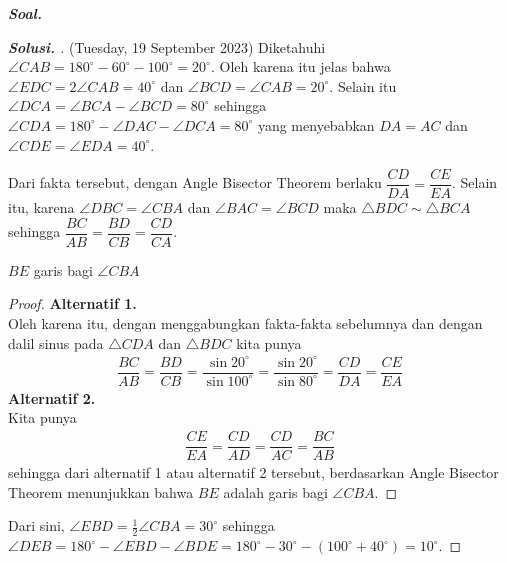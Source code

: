 \textbf{\textit{Soal. }}
\begin{proof}[\textbf{Solusi. }] (Tuesday, 19 September 2023) Diketahuhi $\angle CAB = 180^\circ - 60^\circ - 100^\circ = 20^\circ$. Oleh karena itu jelas bahwa $\angle EDC = 2\angle CAB = 40^\circ$ dan $\angle BCD = \angle CAB = 20^\circ$. Selain itu $\angle DCA = \angle BCA - \angle BCD = 80^\circ$ sehingga $\angle CDA = 180^\circ - \angle DAC - \angle DCA = 80^\circ$ yang menyebabkan $DA=AC$ dan $\angle CDE = \angle EDA = 40^\circ$.
    
Dari fakta tersebut, dengan Angle Bisector Theorem berlaku $\dfrac{CD}{DA} = \dfrac{CE}{EA}$.
Selain itu, karena $\angle DBC = \angle CBA$ dan $\angle BAC = \angle BCD$ maka $\triangle BDC \sim \triangle BCA$ sehingga $\dfrac{BC}{AB} = \dfrac{BD}{CB} = \dfrac{CD}{CA}$.

\begin{lemmarev}
    $BE$ garis bagi $\angle CBA$
    \begin{proof}
        \textbf{Alternatif 1.}\\
        Oleh karena itu, dengan menggabungkan fakta-fakta sebelumnya dan dengan dalil sinus pada $\triangle CDA$ dan $\triangle BDC$ kita punya
        \begin{align*}
            \dfrac{BC}{AB}=\dfrac{BD}{CB} = \dfrac{\sin 20^\circ}{\sin 100^\circ} = \dfrac{\sin 20^\circ}{\sin 80^\circ} = \dfrac{CD}{DA} = \dfrac{CE}{EA}
        \end{align*}
        \textbf{Alternatif 2.}\\
        Kita punya
        \begin{align*}
            \dfrac{CE}{EA} = \dfrac{CD}{AD} = \dfrac{CD}{AC}  = \dfrac{BC}{AB}
        \end{align*}
        sehingga dari alternatif 1 atau alternatif 2 tersebut, berdasarkan Angle Bisector Theorem menunjukkan bahwa $BE$ adalah garis bagi $\angle CBA$.
    \end{proof}
\end{lemmarev}
Dari sini, $\angle EBD = \frac{1}{2}\angle CBA = 30^\circ$ sehingga $\angle DEB = 180^\circ - \angle EBD - \angle BDE = 180^\circ - 30^\circ - (100^\circ + 40^\circ) = 10^\circ$.
\end{proof}